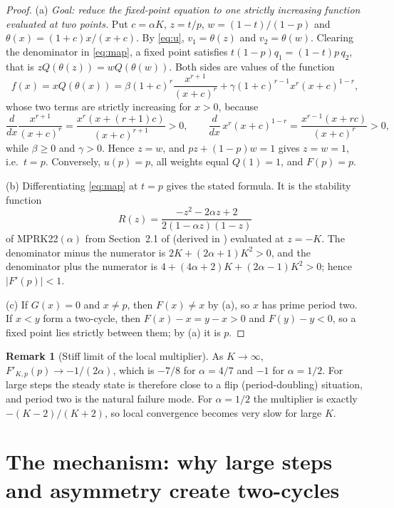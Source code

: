 \documentclass[11pt,a4paper]{article}
\theoremstyle{plain}
\theoremstyle{definition}
\newtheorem{remark}[theorem]{Remark}
\begin{document}
\begin{proof}
(a) \emph{Goal: reduce the fixed-point equation to one strictly increasing function evaluated at two points.} Put $c=\alpha K$, $z=t/p$, $w=(1-t)/(1-p)$ and $\theta(x)=(1+c)x/(x+c)$. By \eqref{eq:u}, $v_1=\theta(z)$ and $v_2=\theta(w)$. Clearing the denominator in \eqref{eq:map}, a fixed point satisfies $t(1-p)q_1=(1-t)p\,q_2$, that is $zQ(\theta(z))=wQ(\theta(w))$. Both sides are values of the function
\[
 f(x)=xQ(\theta(x))=\beta(1+c)^r\frac{x^{r+1}}{(x+c)^r}+\gamma(1+c)^{r-1}x^r(x+c)^{1-r},
\]
whose two terms are strictly increasing for $x>0$, because
\[
 \frac{d}{dx}\frac{x^{r+1}}{(x+c)^r}=\frac{x^r(x+(r+1)c)}{(x+c)^{r+1}}>0,\qquad \frac{d}{dx}\,x^r(x+c)^{1-r}=\frac{x^{r-1}(x+rc)}{(x+c)^r}>0,
\]
while $\beta\ge0$ and $\gamma>0$. Hence $z=w$, and $pz+(1-p)w=1$ gives $z=w=1$, i.e.\ $t=p$. Conversely, $u(p)=p$, all weights equal $Q(1)=1$, and $F(p)=p$.

(b) Differentiating \eqref{eq:map} at $t=p$ gives the stated formula. It is the stability function
\[
 R(z)=\frac{-z^2-2\alpha z+2}{2(1-\alpha z)(1-z)}
\]
of MPRK22$(\alpha)$ from Section~2.1 of \cite{IKMS2024} (derived in \cite{IKM2022a}) evaluated at $z=-K$. The denominator minus the numerator is $2K+(2\alpha+1)K^2>0$, and the denominator plus the numerator is $4+(4\alpha+2)K+(2\alpha-1)K^2>0$; hence $|F'(p)|<1$.

(c) If $G(x)=0$ and $x\ne p$, then $F(x)\ne x$ by (a), so $x$ has prime period two. If $x<y$ form a two-cycle, then $F(x)-x=y-x>0$ and $F(y)-y<0$, so a fixed point lies strictly between them; by (a) it is $p$.
\end{proof}

\begin{remark}[Stiff limit of the local multiplier]\label{rem:flip}
As $K\to\infty$, $F'_{K,p}(p)\to-1/(2\alpha)$, which is $-7/8$ for $\alpha=4/7$ and $-1$ for $\alpha=1/2$. For large steps the steady state is therefore close to a flip (period-doubling) situation, and period two is the natural failure mode. For $\alpha=1/2$ the multiplier is exactly $-(K-2)/(K+2)$, so local convergence becomes very slow for large $K$.
\end{remark}

\section{The mechanism: why large steps and asymmetry create two-cycles}\label{sec:mechanism}
\end{document}
